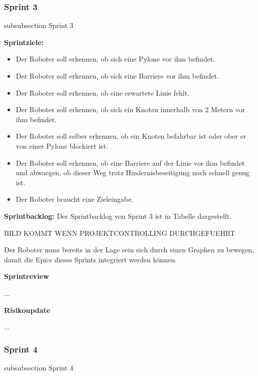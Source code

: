 \subsubsection*{Sprint 3}
    {subsubsection}
    {Sprint 3}

\textbf{Sprintziele:}
\begin{itemize}
    \item Der Roboter soll erkennen, ob sich eine Pylone vor ihm befindet.
    \item Der Roboter soll erkennen, ob sich eine Barriere vor ihm befindet.
    \item Der Roboter soll erkennen, ob eine erwartete Linie fehlt.
    \item Der Roboter soll erkennen, ob sich ein Knoten innerhalb von 2 Metern vor ihm befindet.
    \item Der Roboter soll selber erkennen, ob ein Knoten befahrbar ist oder ober er von einer Pylone blockiert ist.
    \item Der Roboter soll erkennen, ob eine Barriere auf der Linie vor ihm befindet und abwaegen, ob dieser Weg trotz Hindernisbeseitigung noch schnell genug ist.
    \item Der Roboter braucht eine Zieleingabe.

\end{itemize}

\textbf{Sprintbacklog:} Der Sprintbacklog von Sprint 3 ist in Tabelle 
dargestellt.

BILD KOMMT WENN PROJEKTCONTROLLING DURCHGEFUEHRT


Der Roboter muss bereits in der Lage sein sich durch einen Graphen zu bewegen, damit die Epics dieses Sprints integriert werden können.


\textbf{Sprintreview}

...

\textbf{Risikoupdate}

...


\newpage


\subsubsection*{Sprint 4}
    {subsubsection}
    {Sprint 4}
    
